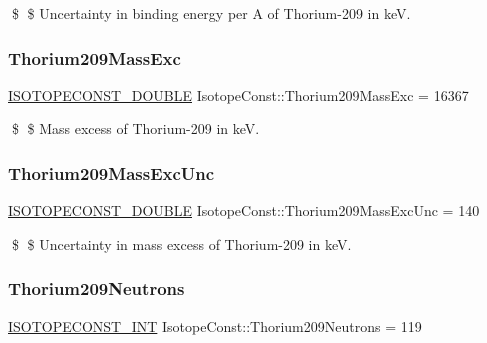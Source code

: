 \$ \$ Uncertainty in binding energy per A of Thorium-\/209 in keV. \mbox{\label{group___isotope_const-_thorium-_th209_ga5992d540ba8e0e1ef7de9c07af255834}} 
\subsubsection{\texorpdfstring{Thorium209\+Mass\+Exc}{Thorium209MassExc}}
{\footnotesize\ttfamily \mbox{\hyperlink{group___isotope_const-_macros_ga8f45a7272ce02c0b4c65c44636ed719a}{I\+S\+O\+T\+O\+P\+E\+C\+O\+N\+S\+T\+\_\+\+D\+O\+U\+B\+LE}} Isotope\+Const\+::\+Thorium209\+Mass\+Exc = 16367}

\$ \$ Mass excess of Thorium-\/209 in keV. \mbox{\label{group___isotope_const-_thorium-_th209_ga0a20003e7b2707a4e490edf7ec32cef2}} 
\subsubsection{\texorpdfstring{Thorium209\+Mass\+Exc\+Unc}{Thorium209MassExcUnc}}
{\footnotesize\ttfamily \mbox{\hyperlink{group___isotope_const-_macros_ga8f45a7272ce02c0b4c65c44636ed719a}{I\+S\+O\+T\+O\+P\+E\+C\+O\+N\+S\+T\+\_\+\+D\+O\+U\+B\+LE}} Isotope\+Const\+::\+Thorium209\+Mass\+Exc\+Unc = 140}

\$ \$ Uncertainty in mass excess of Thorium-\/209 in keV. \mbox{\label{group___isotope_const-_thorium-_th209_gaca9279600406b2b4a858cae009086972}} 
\subsubsection{\texorpdfstring{Thorium209\+Neutrons}{Thorium209Neutrons}}
{\footnotesize\ttfamily \mbox{\hyperlink{group___isotope_const-_macros_ga5f18360b3e99483a35c32d789e62621c}{I\+S\+O\+T\+O\+P\+E\+C\+O\+N\+S\+T\+\_\+\+I\+NT}} Isotope\+Const\+::\+Thorium209\+Neutrons = 119}

